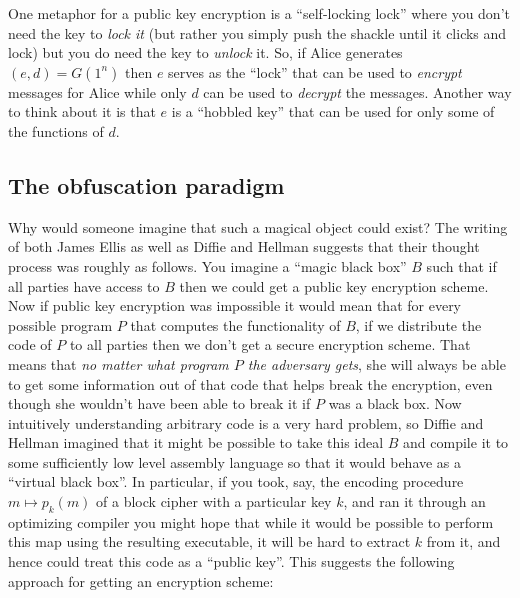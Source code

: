 One metaphor for a public key encryption is a ``self-locking lock''
where you don't need the key to \emph{lock it} (but rather you simply
push the shackle until it clicks and lock) but you do need the key to
\emph{unlock} it. So, if Alice generates \((e,d)=G(1^n)\) then \(e\)
serves as the ``lock'' that can be used to \emph{encrypt} messages for
Alice while only \(d\) can be used to \emph{decrypt} the messages.
Another way to think about it is that \(e\) is a ``hobbled key'' that
can be used for only some of the functions of \(d\).

\subsection{The obfuscation paradigm}\label{The-obfuscation-paradigm}

Why would someone imagine that such a magical object could exist? The
writing of both James Ellis as well as Diffie and Hellman suggests that
their thought process was roughly as follows. You imagine a ``magic
black box'' \(B\) such that if all parties have access to \(B\) then we
could get a public key encryption scheme. Now if public key encryption
was impossible it would mean that for every possible program \(P\) that
computes the functionality of \(B\), if we distribute the code of \(P\)
to all parties then we don't get a secure encryption scheme. That means
that \emph{no matter what program \(P\) the adversary gets}, she will
always be able to get some information out of that code that helps break
the encryption, even though she wouldn't have been able to break it if
\(P\) was a black box. Now intuitively understanding arbitrary code is a
very hard problem, so Diffie and Hellman imagined that it might be
possible to take this ideal \(B\) and compile it to some sufficiently
low level assembly language so that it would behave as a ``virtual black
box''. In particular, if you took, say, the encoding procedure
\(m \mapsto p_k(m)\) of a block cipher with a particular key \(k\), and
ran it through an optimizing compiler you might hope that while it would
be possible to perform this map using the resulting executable, it will
be hard to extract \(k\) from it, and hence could treat this code as a
``public key''. This suggests the following approach for getting an
encryption scheme:

